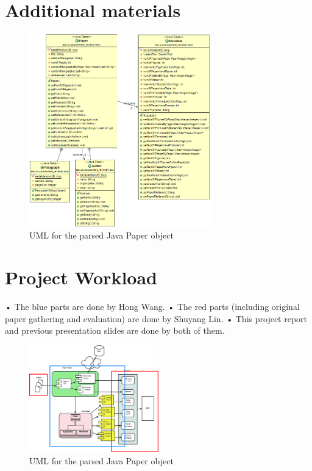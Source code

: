 \documentclass[11pt,letterpaper]{article}
\begin{document}
\begin{appendices}
\chapter{Additional materials}
\begin{figure}[htb]
  \centering
	 	 \includegraphics[width=0.7\textwidth]{materials/paper_uml.png}
		\caption{UML for the parsed Java Paper object}
		\label{fig:uml}
\end{figure}



\chapter{Project Workload}
•	The blue parts are done by Hong Wang.
•	The red parts (including original paper gathering and evaluation) are done by Shuyang Lin.
•	This project report and previous presentation slides are done by both of them. 

\begin{figure}[htb]
  \centering
	 	 \includegraphics[width=0.5\textwidth]{materials/workload.eps}
		\caption{UML for the parsed Java Paper object}
		\label{fig:workload}
\end{figure}



\end{appendices}
\end{document}

